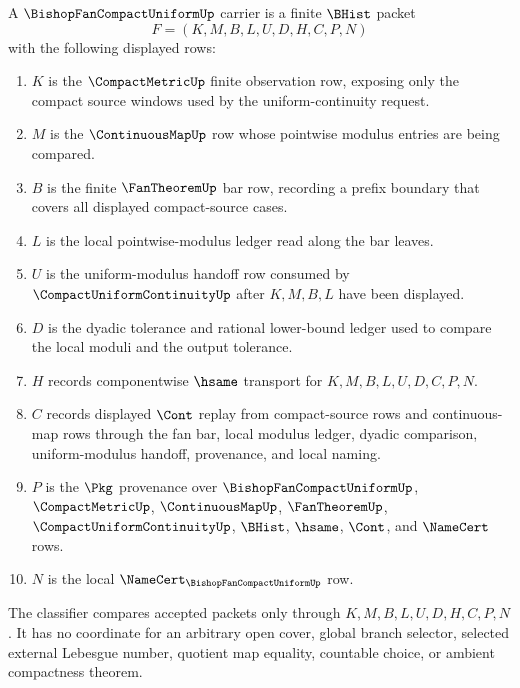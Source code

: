 \begin{definition}\label{def:compact-uniform-bishop-fan-carrier}
A $\BishopFanCompactUniformUp$ carrier is a finite $\BHist$ packet
$$
F=(K,M,B,L,U,D,H,C,P,N)
$$
with the following displayed rows:
\begin{enumerate}
\item $K$ is the $\CompactMetricUp$ finite observation row, exposing only the compact source windows used by the uniform-continuity request.
\item $M$ is the $\ContinuousMapUp$ row whose pointwise modulus entries are being compared.
\item $B$ is the finite $\FanTheoremUp$ bar row, recording a prefix boundary that covers all displayed compact-source cases.
\item $L$ is the local pointwise-modulus ledger read along the bar leaves.
\item $U$ is the uniform-modulus handoff row consumed by $\CompactUniformContinuityUp$ after $K,M,B,L$ have been displayed.
\item $D$ is the dyadic tolerance and rational lower-bound ledger used to compare the local moduli and the output tolerance.
\item $H$ records componentwise $\hsame$ transport for $K,M,B,L,U,D,C,P,N$.
\item $C$ records displayed $\Cont$ replay from compact-source rows and continuous-map rows through the fan bar, local modulus ledger, dyadic comparison, uniform-modulus handoff, provenance, and local naming.
\item $P$ is the $\Pkg$ provenance over $\BishopFanCompactUniformUp$, $\CompactMetricUp$, $\ContinuousMapUp$, $\FanTheoremUp$, $\CompactUniformContinuityUp$, $\BHist$, $\hsame$, $\Cont$, and $\NameCert$ rows.
\item $N$ is the local $\NameCert_{\BishopFanCompactUniformUp}$ row.
\end{enumerate}
The classifier compares accepted packets only through $K,M,B,L,U,D,H,C,P,N$. It has no coordinate for an arbitrary open cover, global branch selector, selected external Lebesgue number, quotient map equality, countable choice, or ambient compactness theorem.
\end{definition}

